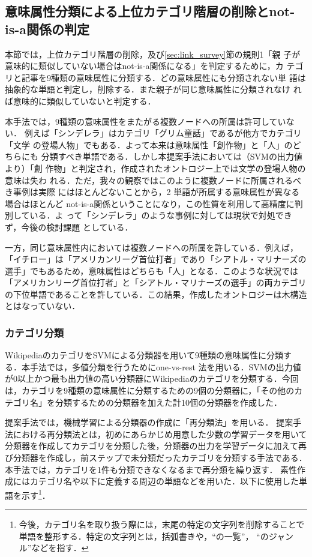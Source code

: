 \documentclass[japanese]{jnlp_1.4}
\begin{document}
\subsection{意味属性分類による上位カテゴリ階層の削除とnot-is-a関係の判定}
\label{sec:isa_hantei_zokusei}

本節では，上位カテゴリ階層の削除，及び\ref{sec:link_survey}節の規則1「親
子が意味的に類似していない場合はnot-is-a関係になる」を判定するために，カ
テゴリと記事を9種類の意味属性に分類する．どの意味属性にも分類されない単
語は抽象的な単語と判定し，削除する．また親子が同じ意味属性に分類されなけ
れば意味的に類似していないと判定する．

本手法では，9種類の意味属性をまたがる複数ノードへの所属は許可していない．
例えば「シンデレラ」はカテゴリ「グリム童話」であるが他方でカテゴリ「文学
の登場人物」でもある．よって本来は意味属性「創作物」と「人」のどちらにも
分類すべき単語である．しかし本提案手法においては（SVMの出力値より）「創
作物」と判定され，作成されたオントロジー上では文学の登場人物の意味は失わ
れる．ただ，我々の観察ではこのように複数ノードに所属されるべき事例は実際
にはほとんどないことから，2 単語が所属する意味属性が異なる場合はほとんど
not-is-a関係ということになり，この性質を利用して高精度に判別している．よ
って「シンデレラ」のような事例に対しては現状で対処できず，今後の検討課題
としている．

一方，同じ意味属性内においては複数ノードへの所属を許している．例えば，
「イチロー」は「アメリカンリーグ首位打者」であり「シアトル・マリナーズの
選手」でもあるため，意味属性はどちらも「人」となる．このような状況では
「アメリカンリーグ首位打者」と「シアトル・マリナーズの選手」の両カテゴリ
の下位単語であることを許している．この結果，作成したオントロジーは木構造
とはなっていない．


\subsubsection{カテゴリ分類}
\label{sec:category_bunrui_mondai}

WikipediaのカテゴリをSVMによる分類器を用いて9種類の意味属性に分類する．本手法では，多値分類を行うためにone-vs-rest 法を用いる．SVMの出力値が0以上かつ最も出力値の高い分類器にWikipediaのカテゴリを分類する．今回は，カテゴリを9種類の意味属性に分類するための9個の分類器に，「その他のカテゴリ名」を分類するための分類器を加えた計10個の分類器を作成した．

提案手法では，機械学習による分類器の作成に「再分類法」を用いる．
提案手法における再分類法とは，初めにあらかじめ用意した少数の学習データを用いて分類器を作成してカテゴリを分類した後，分類器の出力を学習データに加えて再び分類器を作成し，前ステップで未分類だったカテゴリを分類する手法である．
本手法では，カテゴリを1件も分類できなくなるまで再分類を繰り返す．
素性作成にはカテゴリ名や以下に定義する周辺の単語などを用いた．以下に使用した単語を示す\footnote{今後，カテゴリ名を取り扱う際には，末尾の特定の文字列を削除することで単語を整形する．特定の文字列とは，括弧書きや，``の一覧''， ``のジャンル''などを指す．}．
\end{document}
